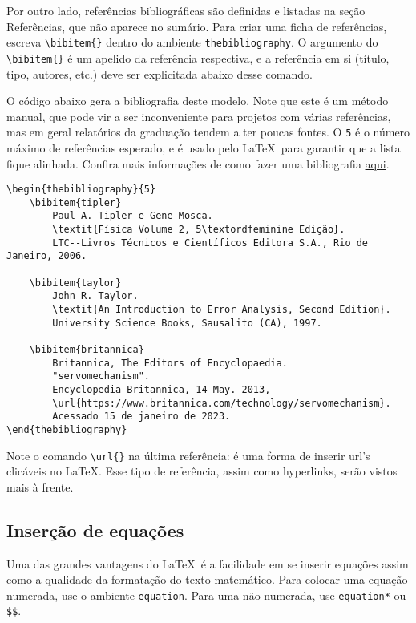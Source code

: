         Por outro lado, referências bibliográficas são definidas e listadas na seção Referências, que não aparece no sumário.
        Para criar uma ficha de referências, escreva \verb|\bibitem{}| dentro do ambiente \verb|thebibliography|.
        O argumento do \verb|\bibitem{}| é um apelido da referência respectiva, e a referência em si (título, tipo, autores, etc.) deve ser explicitada abaixo desse comando.

        O código abaixo gera a bibliografia deste modelo. Note que este é um método manual, que pode vir a ser inconveniente para projetos com várias referências, mas em geral relatórios da graduação tendem a ter poucas fontes.
        O {\tt 5} é o número máximo de referências esperado, e é usado pelo \LaTeX~para garantir que a lista fique alinhada. 
        Confira mais informações de como fazer uma bibliografia 
        \href{https://www.overleaf.com/learn/latex/Bibliography_management_with_bibtex}{aqui}.

        \begin{verbatim}
\begin{thebibliography}{5}
    \bibitem{tipler} 
        Paul A. Tipler e Gene Mosca.
        \textit{Física Volume 2, 5\textordfeminine Edição}. 
        LTC--Livros Técnicos e Científicos Editora S.A., Rio de Janeiro, 2006. 
    
    \bibitem{taylor}
        John R. Taylor. 
        \textit{An Introduction to Error Analysis, Second Edition}. 
        University Science Books, Sausalito (CA), 1997. 

    \bibitem{britannica}
        Britannica, The Editors of Encyclopaedia. 
        "servomechanism".
        Encyclopedia Britannica, 14 May. 2013, 
        \url{https://www.britannica.com/technology/servomechanism}. 
        Acessado 15 de janeiro de 2023.
\end{thebibliography}
        \end{verbatim}

        Note o comando \verb|\url{}| na última referência: é uma forma de inserir url's clicáveis no \LaTeX.
        Esse tipo de referência, assim como hyperlinks, serão vistos mais à frente.
    
    \subsection{Inserção de equações}
        Uma das grandes vantagens do \LaTeX~é a facilidade em se inserir equações assim como a qualidade da formatação do texto matemático.
        Para colocar uma equação numerada, use o ambiente {\tt equation}. Para uma não numerada, use {\tt equation*} ou \verb|$$|.

